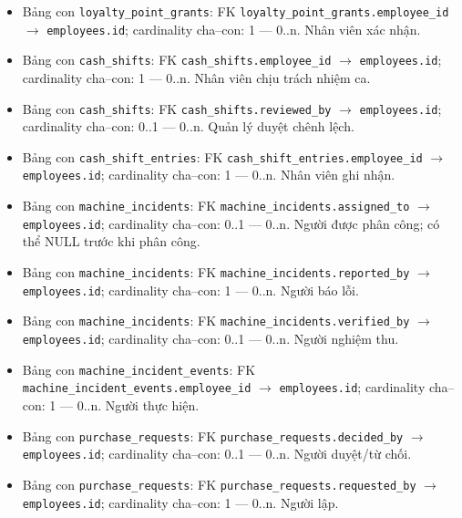\begin{itemize}
\item Bảng con \texttt{loyalty\_point\_grants}: FK \texttt{loyalty\_point\_grants.employee\_id} $\rightarrow$ \texttt{employees.id}; cardinality cha--con: 1 — 0..n. Nhân viên xác nhận.

\item Bảng con \texttt{cash\_shifts}: FK \texttt{cash\_shifts.employee\_id} $\rightarrow$ \texttt{employees.id}; cardinality cha--con: 1 — 0..n. Nhân viên chịu trách nhiệm ca.

\item Bảng con \texttt{cash\_shifts}: FK \texttt{cash\_shifts.reviewed\_by} $\rightarrow$ \texttt{employees.id}; cardinality cha--con: 0..1 — 0..n. Quản lý duyệt chênh lệch.

\item Bảng con \texttt{cash\_shift\_entries}: FK \texttt{cash\_shift\_entries.employee\_id} $\rightarrow$ \texttt{employees.id}; cardinality cha--con: 1 — 0..n. Nhân viên ghi nhận.

\item Bảng con \texttt{machine\_incidents}: FK \texttt{machine\_incidents.assigned\_to} $\rightarrow$ \texttt{employees.id}; cardinality cha--con: 0..1 — 0..n. Người được phân công; có thể NULL trước khi phân công.

\item Bảng con \texttt{machine\_incidents}: FK \texttt{machine\_incidents.reported\_by} $\rightarrow$ \texttt{employees.id}; cardinality cha--con: 1 — 0..n. Người báo lỗi.

\item Bảng con \texttt{machine\_incidents}: FK \texttt{machine\_incidents.verified\_by} $\rightarrow$ \texttt{employees.id}; cardinality cha--con: 0..1 — 0..n. Người nghiệm thu.

\item Bảng con \texttt{machine\_incident\_events}: FK \texttt{machine\_incident\_events.employee\_id} $\rightarrow$ \texttt{employees.id}; cardinality cha--con: 1 — 0..n. Người thực hiện.

\item Bảng con \texttt{purchase\_requests}: FK \texttt{purchase\_requests.decided\_by} $\rightarrow$ \texttt{employees.id}; cardinality cha--con: 0..1 — 0..n. Người duyệt/từ chối.

\item Bảng con \texttt{purchase\_requests}: FK \texttt{purchase\_requests.requested\_by} $\rightarrow$ \texttt{employees.id}; cardinality cha--con: 1 — 0..n. Người lập.


\end{itemize}
